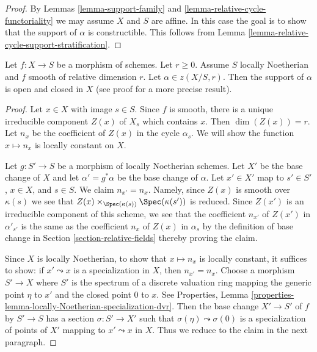 \begin{proof}
By Lemmas \ref{lemma-support-family} and
\ref{lemma-relative-cycle-functoriality}
we may assume $X$ and $S$ are affine. In this case the goal is to
show that the support of $\alpha$ is constructible.
This follows from Lemma \ref{lemma-relative-cycle-support-stratification}.
\end{proof}

\begin{lemma}
\label{lemma-relative-cycle-smooth}
Let $f : X \to S$ be a morphism of schemes. Let $r \geq 0$. Assume $S$
locally Noetherian and $f$ smooth of relative dimension $r$. Let
$\alpha \in z(X/S, r)$. Then the support of $\alpha$ is open and closed in $X$
(see proof for a more precise result).
\end{lemma}

\begin{proof}
Let $x \in X$ with image $s \in S$. Since $f$ is smooth, there is a
unique irreducible component $Z(x)$ of $X_s$ which contains $x$.
Then $\dim(Z(x)) = r$.
Let $n_x$ be the coefficient of $Z(x)$ in the cycle $\alpha_s$.
We will show the function $x \mapsto n_x$ is locally constant on $X$.

\medskip\noindent
Let $g : S' \to S$ be a morphism of locally Noetherian schemes.
Let $X'$ be the base change of $X$ and let $\alpha' = g^*\alpha$
be the base change of $\alpha$. Let $x' \in X'$ map to $s' \in S'$,
$x \in X$, and $s \in S$. We claim $n_{x'} = n_x$. Namely, since $Z(x)$
is smooth over $\kappa(s)$ we see that
$Z(x) \times_{\Spec(\kappa(s))} \Spec(\kappa(s'))$
is reduced. Since $Z(x')$ is an irreducible component
of this scheme, we see that the coefficient $n_{x'}$ of $Z(x')$
in $\alpha'_{s'}$ is the same as the coefficient $n_x$ of $Z(x)$
in $\alpha_s$ by the definition of base change in
Section \ref{section-relative-fields}
thereby proving the claim.

\medskip\noindent
Since $X$ is locally Noetherian, to show that $x \mapsto n_x$
is locally constant, it suffices to show: if $x' \leadsto x$
is a specialization in $X$, then $n_{x'} = n_x$.
Choose a morphism $S' \to X$ where $S'$ is the spectrum of a discrete
valuation ring mapping the generic point $\eta$ to $x'$ and the closed point
$0$ to $x$. See Properties, Lemma
\ref{properties-lemma-locally-Noetherian-specialization-dvr}.
Then the base change $X' \to S'$ of $f$ by $S' \to S$
has a section $\sigma : S' \to X'$ such that $\sigma(\eta) \leadsto \sigma(0)$
is a specialization of points of $X'$ mapping to $x' \leadsto x$ in $X$.
Thus we reduce to the claim in the next paragraph.


\end{proof}
